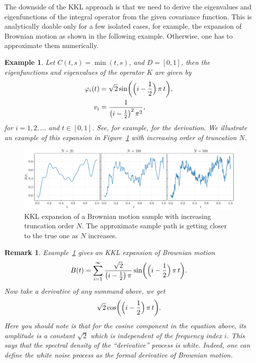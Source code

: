 \documentclass[]{article}
\newtheorem{remark}[theorem]{Remark}
\newtheorem{example}[theorem]{Example}
\begin{document}
The downside of the KKL approach is that we need to derive the eigenvalues and eigenfunctions of the integral operator from the given covariance function. This is analytically doable only for a few isolated cases, for example, the expansion of Brownian motion as shown in the following example. Otherwise, one has to approximate them numerically.

\begin{example}
	\label{example:kkt-bm}
	Let $C(t,s) = \min(t,s)$, and $D = [0, 1]$, then the eigenfunctions and eigenvalues of the operator $K$ are given by
	\begin{equation*}
		\begin{split}
			\varphi_i(t) &= \sqrt{2} \sin\biggl( \Bigl(i - \frac{1}{2} \Bigr) \, \pi \, t \biggr), \\
			v_i &= \frac{1}{\bigl(i - \frac{1}{2} \bigr)^2 \, \pi^2},
		\end{split}
	\end{equation*}
	for $i=1,2,\ldots$ and $t\in[0, 1]$. See, for example, \citet[][pp. 205]{Lord2014} for the derivation. We illustrate an example of this expansion in Figure~\ref{fig:kkt-bw} with increasing order of truncation $N$.
\end{example}

\begin{figure}[t!]
	\centering
	\includegraphics[width=.98\linewidth]{figs/kkl-bw}
	\caption{KKL expansion of a Brownian motion sample with increasing truncation order $N$. The approximate sample path is getting closer to the true one as $N$ increases.}
	\label{fig:kkt-bw}
\end{figure}

\begin{remark}
	Example~\ref{example:kkt-bm} gives an KKL expansion of Brownian motion
	\begin{equation*}
		B(t) = \sum^\infty_{i=1} \frac{\sqrt{2}}{\bigl(i - \frac{1}{2} \bigr) \, \pi} \sin\biggl( \Bigl(i - \frac{1}{2} \Bigr) \, \pi \, t \biggr).
	\end{equation*}
	Now take a derivative of any summand above, we get
	\begin{equation*}
		\sqrt{2} \cos\biggl( \Bigl(i - \frac{1}{2} \Bigr) \, \pi \, t \biggr).
	\end{equation*}
	Here you should note is that for the cosine component in the equation above, its amplitude is a constant $\sqrt{2}$ which is independent of the frequency index $i$. This says that the spectral density of the ``derivative'' process is white. Indeed, one can define the white noise process as the formal derivative of Brownian motion.
\end{remark}
\end{document}
